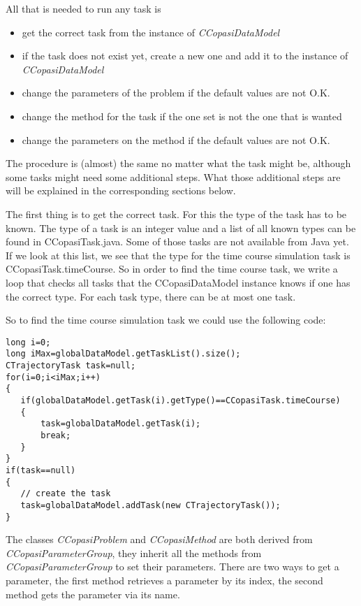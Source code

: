 \documentclass[a4,12pt]{article}
\begin{document}
All that is needed to run any task is 
\begin{itemize}
\item{get the correct task from the instance of \textit{CCopasiDataModel}}
\item{if the task does not exist yet, create a new one and add it to the instance of \textit{CCopasiDataModel}}
\item{change the parameters of the problem if the default values are not O.K.}
\item{change the method for the task if the one set is not the one that is wanted}
\item{change the parameters on the method if the default values are not O.K.}
\end{itemize}

The procedure is (almost) the same no matter what the task might be, although some tasks might need some additional steps. What those additional steps are will be explained in the corresponding sections below.   

The first thing is to get the correct task. For this the type of the task has to be known. The type of a task is an integer value and a list of all known types can be found in CCopasiTask.java. Some of those tasks are not available from Java yet. If we look at this list, we see that the type for the time course simulation task is CCopasiTask.timeCourse. So in order to find the time course task, we write a loop that checks all tasks that the CCopasiDataModel instance knows if one has the correct type. For each task type, there can be at most one task.

So to find the time course simulation task we could use the following code:

\begin{lstlisting}
long i=0;
long iMax=globalDataModel.getTaskList().size();
CTrajectoryTask task=null;
for(i=0;i<iMax;i++)
{
   if(globalDataModel.getTask(i).getType()==CCopasiTask.timeCourse)
   {
       task=globalDataModel.getTask(i);
       break;
   }
}
if(task==null)
{
   // create the task
   task=globalDataModel.addTask(new CTrajectoryTask());
}
\end{lstlisting}

The classes \textit{CCopasiProblem} and \textit{CCopasiMethod} are both derived from \textit{CCopasiParameterGroup}, they inherit all the methods from \textit{CCopasiParameterGroup} to set their parameters.
There are two ways to get a parameter, the first method retrieves a parameter by its index, the second method gets the parameter via its name.
\end{document}
